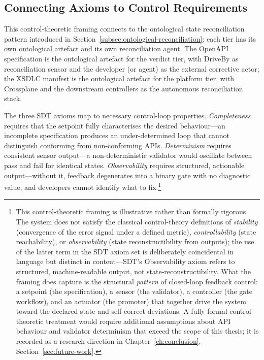 \subsection{Connecting Axioms to Control Requirements}
\label{subsec:theory-implementation}

This control-theoretic framing connects to the ontological state reconciliation pattern introduced in Section~\ref{subsec:ontological-reconciliation}: each tier has its own ontological artefact and its own reconciliation agent. The OpenAPI specification is the ontological artefact for the verdict tier, with DriveBy as reconciliation sensor and the developer (or agent) as the external corrective actor; the XSDLC manifest is the ontological artefact for the platform tier, with Crossplane and the downstream controllers as the autonomous reconciliation stack.

The three SDT axioms map to necessary control-loop properties. \textit{Completeness} requires that the setpoint fully characterises the desired behaviour---an incomplete specification produces an under-determined loop that cannot distinguish conforming from non-conforming APIs. \textit{Determinism} requires consistent sensor output---a non-deterministic validator would oscillate between pass and fail for identical states. \textit{Observability} requires structured, actionable output---without it, feedback degenerates into a binary gate with no diagnostic value, and developers cannot identify what to fix.\footnote{This control-theoretic framing is illustrative rather than formally rigorous. The system does not satisfy the classical control-theory definitions of \textit{stability} (convergence of the error signal under a defined metric), \textit{controllability} (state reachability), or \textit{observability} (state reconstructibility from outputs); the use of the latter term in the SDT axiom set is deliberately coincidental in language but distinct in content---SDT's Observability axiom refers to structured, machine-readable output, not state-reconstructibility. What the framing does capture is the structural \textit{pattern} of closed-loop feedback control: a setpoint (the specification), a sensor (the validator), a controller (the gate workflow), and an actuator (the promoter) that together drive the system toward the declared state and self-correct deviations. A fully formal control-theoretic treatment would require additional assumptions about API behaviour and validator determinism that exceed the scope of this thesis; it is recorded as a research direction in Chapter~\ref{ch:conclusion}, Section~\ref{sec:future-work}.}

